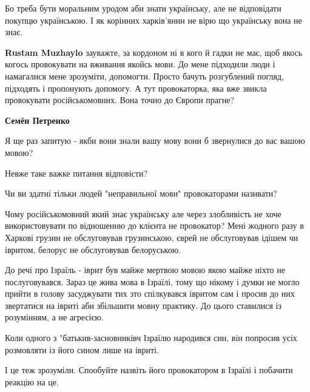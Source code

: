 \begin{itemize}
\begin{itemize}
Бо треба бути моральним уродом аби знати українську, але не відповідати покупцю
українською. І як корінних харків'янин не вірю що українську вона не знає.

 
\textbf{Rustam Muzhaylo} зауважте, за кордоном ні в кого й гадки не має, щоб
якось когось провокувати на вживання якойсь мови. До мене підходили люди і
намагалися мене зрозуміти, допомогти. Просто бачуть розгублений погляд,
підходять і пропонують допомогу. А тут провокаторка, яка вже звикла провокувати
російськомовних. Вона точно до Європи прагне?


 
\textbf{Семён Петренко}

Я ще раз запитую - якби вони знали вашу мову вони б звернулися до вас вашою
мовою?

Невже таке важке питання відповісти?

Чи ви здатні тільки людей "неправильної мови" провокаторами називати?

Чому російськомовний який знає українську але через злобливість не хоче
використовувати по відношенню до клієнта не провокатор? Мені жодного разу в
Харкові грузин не обслуговував грузинською, єврей не обслуговував ідішем чи
івритом, белорус не обслуговував белоруською.

До речі про Ізраїль - іврит був майже мертвою мовою якою майже ніхто не
послуговувався. Зараз це жива мова в Ізраїлі, тому що нікому і думки не могло
прийти в голову засуджувати тих зто спілкувався івритом сам і просив до них
звертатися на івриті аби збільшити мовну практику. До цього ставилися із
розумінням, а не агресією.

Коли одного з "батькив-засновниківч Ізраїлю народився син, він попросив усіх
розмовляти із його сином лише на івриті.

І це теж зрозуміли. Спообуйте назвіть його провокатором в Ізраїлі і побачити
реакцію на це.

 

\end{itemize}
\end{itemize}
